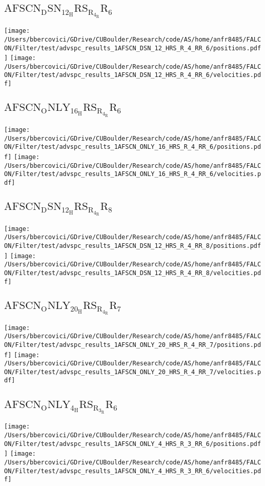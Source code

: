 \subsection{$\mathrm{AFSCN_DSN_12_HRS_R_4_RR_6}$}
\texttt{[image: /Users/bbercovici/GDrive/CUBoulder/Research/code/AS/home/anfr8485/FALCON/Filter/test/advspc\_results\_1AFSCN\_DSN\_12\_HRS\_R\_4\_RR\_6/positions.pdf]}
\texttt{[image: /Users/bbercovici/GDrive/CUBoulder/Research/code/AS/home/anfr8485/FALCON/Filter/test/advspc\_results\_1AFSCN\_DSN\_12\_HRS\_R\_4\_RR\_6/velocities.pdf]}
\subsection{$\mathrm{AFSCN_ONLY_16_HRS_R_4_RR_6}$}
\texttt{[image: /Users/bbercovici/GDrive/CUBoulder/Research/code/AS/home/anfr8485/FALCON/Filter/test/advspc\_results\_1AFSCN\_ONLY\_16\_HRS\_R\_4\_RR\_6/positions.pdf]}
\texttt{[image: /Users/bbercovici/GDrive/CUBoulder/Research/code/AS/home/anfr8485/FALCON/Filter/test/advspc\_results\_1AFSCN\_ONLY\_16\_HRS\_R\_4\_RR\_6/velocities.pdf]}
\subsection{$\mathrm{AFSCN_DSN_12_HRS_R_4_RR_8}$}
\texttt{[image: /Users/bbercovici/GDrive/CUBoulder/Research/code/AS/home/anfr8485/FALCON/Filter/test/advspc\_results\_1AFSCN\_DSN\_12\_HRS\_R\_4\_RR\_8/positions.pdf]}
\texttt{[image: /Users/bbercovici/GDrive/CUBoulder/Research/code/AS/home/anfr8485/FALCON/Filter/test/advspc\_results\_1AFSCN\_DSN\_12\_HRS\_R\_4\_RR\_8/velocities.pdf]}
\subsection{$\mathrm{AFSCN_ONLY_20_HRS_R_4_RR_7}$}
\texttt{[image: /Users/bbercovici/GDrive/CUBoulder/Research/code/AS/home/anfr8485/FALCON/Filter/test/advspc\_results\_1AFSCN\_ONLY\_20\_HRS\_R\_4\_RR\_7/positions.pdf]}
\texttt{[image: /Users/bbercovici/GDrive/CUBoulder/Research/code/AS/home/anfr8485/FALCON/Filter/test/advspc\_results\_1AFSCN\_ONLY\_20\_HRS\_R\_4\_RR\_7/velocities.pdf]}
\subsection{$\mathrm{AFSCN_ONLY_4_HRS_R_3_RR_6}$}
\texttt{[image: /Users/bbercovici/GDrive/CUBoulder/Research/code/AS/home/anfr8485/FALCON/Filter/test/advspc\_results\_1AFSCN\_ONLY\_4\_HRS\_R\_3\_RR\_6/positions.pdf]}
\texttt{[image: /Users/bbercovici/GDrive/CUBoulder/Research/code/AS/home/anfr8485/FALCON/Filter/test/advspc\_results\_1AFSCN\_ONLY\_4\_HRS\_R\_3\_RR\_6/velocities.pdf]}
